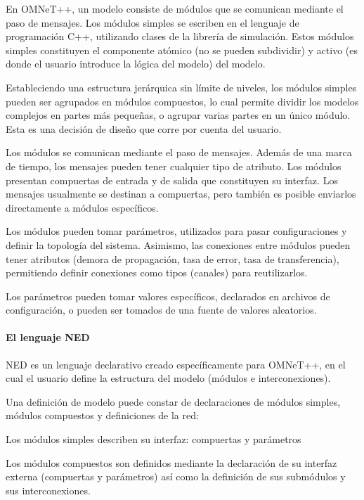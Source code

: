 \documentclass[]{article}
\begin{document}
En OMNeT++, un modelo consiste de módulos que se comunican mediante el paso de
mensajes. Los módulos simples se escriben en el lenguaje de programación C++,
utilizando clases de la librería de simulación. Estos módulos simples
constituyen el componente atómico (no se pueden subdividir) y activo (es donde
el usuario introduce la lógica del modelo) del modelo.

Estableciendo una estructura jerárquica sin límite de niveles, los módulos
simples pueden ser agrupados en módulos compuestos, lo cual permite dividir los
modelos complejos en partes más pequeñas, o agrupar varias partes en un único
módulo. Esta es una decisión de diseño que corre por cuenta del usuario. 

Los módulos se comunican mediante el paso de mensajes. Además de una marca de
tiempo, los mensajes pueden tener cualquier tipo de atributo. Los módulos
presentan compuertas de entrada y de salida que constituyen su interfaz.  Los
mensajes usualmente se destinan a compuertas, pero también es posible enviarlos
directamente a módulos específicos.

Los módulos pueden tomar parámetros, utilizados para pasar configuraciones y
definir la topología del sistema. Asimismo, las conexiones entre módulos pueden
tener atributos (demora de propagación, tasa de error, tasa de transferencia),
permitiendo definir conexiones como tipos (canales) para reutilizarlos.

Los parámetros pueden tomar valores específicos, declarados en archivos de
configuración, o pueden ser tomados de una fuente de valores aleatorios. 

\paragraph{El lenguaje NED}

NED es un lenguaje declarativo creado específicamente para OMNeT++, en el cual
el usuario define la estructura del modelo (módulos e interconexiones).

Una definición de modelo puede constar de declaraciones de módulos simples,
módulos compuestos y definiciones de la red:



Los módulos simples describen su interfaz: compuertas y parámetros

Los módulos compuestos son definidos mediante la declaración de su interfaz
externa (compuertas y parámetros) así como la definición de sus submódulos y
sus interconexiones.
\end{document}
